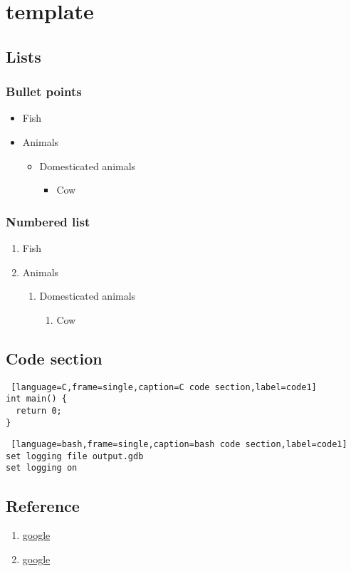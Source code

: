 \chapter{template}

\section{Lists}

\subsection{Bullet points}
\begin{itemize}
  \item Fish
  \item Animals
  \begin{itemize}
    \item Domesticated animals
    \begin{itemize}
      \item Cow
    \end{itemize}
  \end{itemize}
\end{itemize}
  
\subsection{Numbered list}

\begin{enumerate}
  \item Fish
  \item Animals
  \begin{enumerate}
    \item Domesticated animals
    \begin{enumerate}
      \item Cow
    \end{enumerate}
  \end{enumerate}
\end{enumerate}

\section{Code section}
\begin{lstlisting} [language=C,frame=single,caption=C code section,label=code1]
int main() {
  return 0;
}
\end{lstlisting}

\begin{lstlisting} [language=bash,frame=single,caption=bash code section,label=code1]
set logging file output.gdb
set logging on
\end{lstlisting}


\section{Reference}

\begin{enumerate}
  \item \href{https://www.google.com/}{google}
  \item \href{https://www.google.com/}{google}
\end{enumerate}
